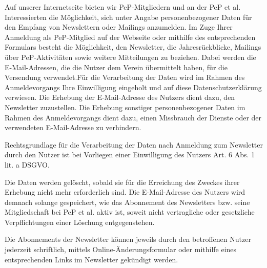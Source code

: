 \documentclass[
  fontsize=12pt,
  paper=a4,
  DIV14,
  parskip,
]{scrartcl}
\begin{document}
Auf unserer Internetseite bieten wir PeP-Mitgliedern und an der PeP et al.
Interessierten die Möglichkeit, sich unter Angabe personenbezogener Daten für
den Empfang von Newslettern oder Mailings anzumelden.
Im Zuge Ihrer Anmeldung als PeP-Mitglied auf der Webseite oder mithilfe des
entsprechenden Formulars besteht die Möglichkeit, den Newsletter, die
Jahresrückblicke, Mailings über PeP-Aktivitäten sowie weitere Mitteilungen zu
beziehen.
Dabei werden die E-Mail-Adressen, die die Nutzer dem Verein übermittelt
haben, für die Versendung verwendet.Für die Verarbeitung der Daten wird im
Rahmen des Anmeldevorgangs Ihre Einwilligung eingeholt und auf diese
Datenschutzerklärung verwiesen.
Die Erhebung der E-Mail-Adresse des Nutzers dient dazu, den Newsletter
zuzustellen. Die Erhebung sonstiger personenbezogener Daten im Rahmen des
Anmeldevorgangs dient dazu, einen Missbrauch der Dienste oder der verwendeten
E-Mail-Adresse zu verhindern.

Rechtsgrundlage für die Verarbeitung der Daten nach Anmeldung zum Newsletter
durch den Nutzer ist bei Vorliegen einer Einwilligung des Nutzers Art. 6 Abs.
1 lit. a DSGVO.

Die Daten werden gelöscht, sobald sie für die Erreichung des Zweckes ihrer
Erhebung nicht mehr erforderlich sind. Die E-Mail-Adresse des Nutzers wird
demnach solange gespeichert, wie das Abonnement des Newsletters bzw. seine
Mitgliedschaft bei PeP et al. aktiv ist, soweit nicht vertragliche oder
gesetzliche Verpflichtungen einer Löschung entgegenstehen.

Die Abonnements der Newsletter können jeweils durch den betroffenen Nutzer
jederzeit schriftlich, mittels Online-Änderungsformular oder mithilfe eines entsprechenden Links im Newsletter gekündigt werden.

\end{document}

